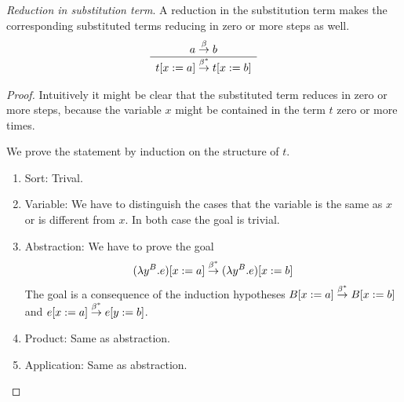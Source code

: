 \begin{theorem}
    \label{ReducedSubstitutionTerm}
    \emph{Reduction in substitution term}. A reduction in the substitution term
    makes the corresponding substituted terms reducing in zero or more steps as
    well.
    $$
    \begin{array}{c} 
        a \stackrel{\beta}{\to} b
     \\ \hline 
        t[x:=a] \stackrel{\beta^*}{\to} t[x:=b]
    \end{array}
    $$
    \begin{proof}
        Intuitively it might be clear that the substituted term reduces in zero
        or more steps, because the variable $x$ might be contained in the term
        $t$ zero or more times.

        We prove the statement by induction on the structure of $t$.

        \begin{enumerate}
        \item Sort: Trival.

        \item Variable: We have to distinguish the cases that the variable is
            the same as $x$ or is different from $x$. In both case the goal is
                trivial.

        \item Abstraction:
            We have to prove the goal
            $$
                (\lambda y^B.e)[x:=a] \stackrel{\beta^*}{\to} (\lambda y^B.e)[x:=b]
            $$
            The goal is a consequence of the induction hypotheses $B[x:=a]
                \stackrel{\beta^*}{\to} B[x:=b]$ and $e[x:=a] \stackrel{\beta^*}{\to} e[y:=b]$.

        \item Product: Same as abstraction.

        \item Application: Same as abstraction.
        \end{enumerate}
    \end{proof}
\end{theorem}



